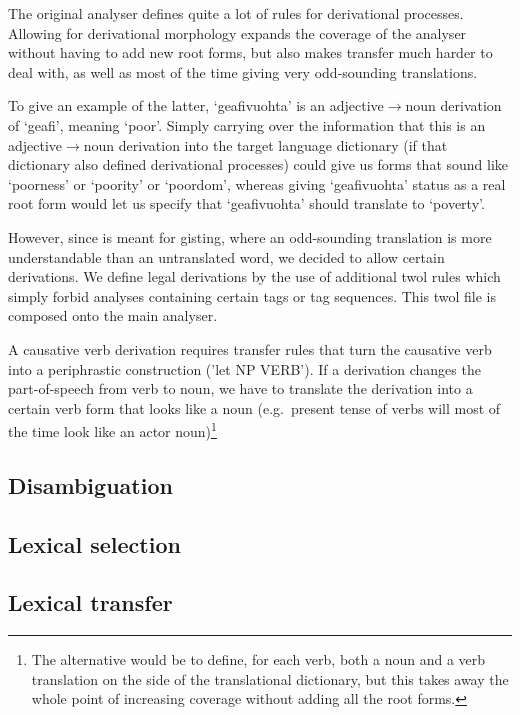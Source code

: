 The original analyser defines quite a lot of rules for derivational
processes. Allowing for derivational morphology expands the coverage
of the analyser without having to add new root forms, but also makes
transfer much harder to deal with, as well as most of the time giving
very odd-sounding translations.

To give an example of the latter, `geafivuohta' is an
adjective$\rightarrow{}$noun derivation of `geafi', meaning `poor'.
Simply carrying over the information that this is an
adjective$\rightarrow{}$noun derivation into the target language
dictionary (if that dictionary also defined derivational processes)
could give us forms that sound like `poorness' or `poority' or
`poordom', whereas giving `geafivuohta' status as a real root form
would let us specify that `geafivuohta' should translate to `poverty'.

However, since \smenob is meant for gisting, where an odd-sounding
translation is more understandable than an untranslated word, we
decided to allow certain derivations. We define legal derivations by
the use of additional twol rules which simply forbid analyses
containing certain tags or tag sequences. This twol file is composed
onto the main analyser.

A causative verb derivation requires transfer rules that turn the
causative verb into a periphrastic construction ('let NP VERB'). If a
derivation changes the part-of-speech from verb to noun, we have to
translate the derivation into a certain verb form that looks like a
noun (e.g.~present tense of \nob verbs will most of the time look like
an actor noun)\footnote{The alternative would be to define, for each
  \sme verb, both a noun and a verb translation on the \nob side of
  the translational dictionary, but this takes away the whole point of
  increasing coverage without adding all the root forms.}




\subsection{Disambiguation}
\subsection{Lexical selection}


\subsection{Lexical transfer}

